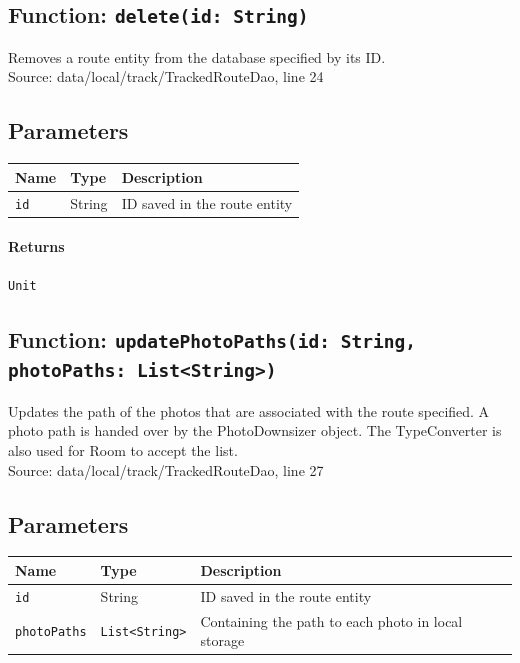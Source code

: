 \documentclass{article}
\begin{document}
            \newpage

            \subsection*{Function: \texttt{delete(id: String)}}

                Removes a route entity from the database specified by its ID. \\
                Source: data/local/track/TrackedRouteDao, line 24
                
                \subsection*{Parameters}

                \begin{tabular}{p{3cm} p{4cm} p{7cm}}
                \toprule
                \textbf{Name} & \textbf{Type} & \textbf{Description} \\ \midrule
                \texttt{id} & String & ID saved in the route entity \\ \bottomrule
                \end{tabular}

                \paragraph{Returns} \texttt{Unit} 

            \hrulefill

            \subsection*{Function: \texttt{updatePhotoPaths(id: String, photoPaths: List<String>)}}

                Updates the path of the photos that are associated with the route
                specified. A photo path is handed over by the PhotoDownsizer object.
                The TypeConverter is also used for Room to accept the list. \\
                Source: data/local/track/TrackedRouteDao, line 27
                
                \subsection*{Parameters}

                \begin{tabular}{p{3cm} p{4cm} p{7cm}}
                \toprule
                \textbf{Name} & \textbf{Type} & \textbf{Description} \\ \midrule
                \texttt{id} & String & ID saved in the route entity \\ \addlinespace
                \texttt{photoPaths} & \texttt{List<String>} & Containing the path to each photo in local storage \\ \bottomrule
                \end{tabular}
\end{document}
